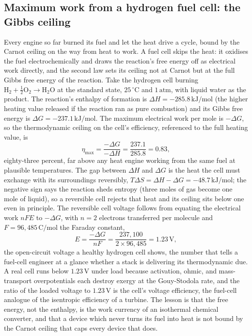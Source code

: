 

\subsection{Maximum work from a hydrogen fuel cell: the Gibbs ceiling}

Every engine so far burned its fuel and let the heat drive a cycle, bound by the
Carnot ceiling on the way from heat to work. A fuel cell skips the heat: it
oxidises the fuel electrochemically and draws the reaction's free energy off as
electrical work directly, and the second law sets its ceiling not at Carnot but
at the full Gibbs free energy of the reaction. Take the hydrogen cell burning
$\mathrm{H_2} + \tfrac12\mathrm{O_2} \to \mathrm{H_2O}$ at the standard state,
$25\,^{\circ}\mathrm{C}$ and $1\,\text{atm}$, with liquid water as the product.
The reaction's enthalpy of formation is $\Delta H = -285.8\,\text{kJ}/\text{mol}$
(the higher heating value released if the reaction ran as pure combustion) and
its Gibbs free energy is $\Delta G = -237.1\,\text{kJ}/\text{mol}$. The maximum
electrical work per mole is $-\Delta G$, so the thermodynamic ceiling on the
cell's efficiency, referenced to the full heating value, is
\[
\eta_{\max} = \frac{-\Delta G}{-\Delta H} = \frac{237.1}{285.8} = 0.83,
\]
eighty-three percent, far above any heat engine working from the same fuel at
plausible temperatures. The gap between $\Delta H$ and $\Delta G$ is the heat the
cell must exchange with its surroundings reversibly, $T\Delta S = \Delta H -
\Delta G = -48.7\,\text{kJ}/\text{mol}$; the negative sign says the reaction sheds
entropy (three moles of gas become one mole of liquid), so a reversible cell
rejects that heat and its ceiling sits below one even in principle. The reversible
cell voltage follows from equating the electrical work $nFE$ to $-\Delta G$, with
$n = 2$ electrons transferred per molecule and $F = 96{,}485\,\text{C}/\text{mol}$
the Faraday constant,
\[
E = \frac{-\Delta G}{nF} = \frac{237{,}100}{2 \times 96{,}485} =
1.23\,\text{V},
\]
the open-circuit voltage a healthy hydrogen cell shows, the number that tells a
fuel-cell engineer at a glance whether a stack is delivering its thermodynamic
due. A real cell runs below $1.23\,\text{V}$ under load because activation,
ohmic, and mass-transport overpotentials each destroy exergy at the
Gouy-Stodola rate, and the ratio of the loaded voltage to $1.23\,\text{V}$ is the
cell's voltage efficiency, the fuel-cell analogue of the isentropic efficiency of
a turbine. The lesson is that the free energy, not the enthalpy, is the work
currency of an isothermal chemical converter, and that a device which never turns
its fuel into heat is not bound by the Carnot ceiling that caps every device that
does.

